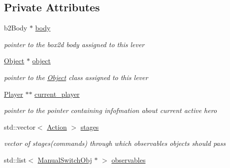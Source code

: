 \subsection*{Private Attributes}
\begin{DoxyCompactItemize}
\item 
\mbox{\label{class_lever_aa063d5dab7eefeee48b93c0ea694bb42}} 
b2\+Body $\ast$ \hyperlink{class_lever_aa063d5dab7eefeee48b93c0ea694bb42}{body}
\begin{DoxyCompactList}\small\item\em pointer to the box2d body assigned to this lever \end{DoxyCompactList}\item 
\mbox{\label{class_lever_aee2d6a9e2fc7ff31a9d8eea2f98b7e32}} 
\hyperlink{class_object}{Object} $\ast$ \hyperlink{class_lever_aee2d6a9e2fc7ff31a9d8eea2f98b7e32}{object}
\begin{DoxyCompactList}\small\item\em pointer to the \hyperlink{class_object}{Object} class assigned to this lever \end{DoxyCompactList}\item 
\mbox{\label{class_lever_ac710b732ab842d55f84488f9d88e325b}} 
\hyperlink{class_player}{Player} $\ast$$\ast$ \hyperlink{class_lever_ac710b732ab842d55f84488f9d88e325b}{current\+\_\+player}
\begin{DoxyCompactList}\small\item\em pointer to the pointer containing infofmation about current active hero \end{DoxyCompactList}\item 
\mbox{\label{class_lever_a8352c41d4452bf72a3f7d4dded03598c}} 
std\+::vector$<$ \hyperlink{_manual_switch_obj_8h_a8bb1ef53467e4f61410d12822d922498}{Action} $>$ \hyperlink{class_lever_a8352c41d4452bf72a3f7d4dded03598c}{stages}
\begin{DoxyCompactList}\small\item\em vector of stages(commands) through which observables objects should pass \end{DoxyCompactList}\item 
\mbox{\label{class_lever_ae7161c7fb8bc611f7d4cc3525d406e81}} 
std\+::list$<$ \hyperlink{class_manual_switch_obj}{Manual\+Switch\+Obj} $\ast$ $>$ \hyperlink{class_lever_ae7161c7fb8bc611f7d4cc3525d406e81}{observables}
$$
\end{DoxyCompactItemize}
